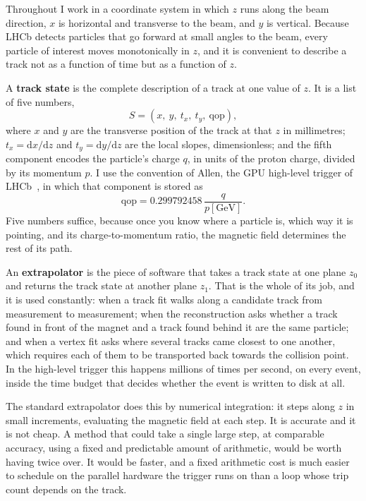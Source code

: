 \documentclass[11pt,a4paper]{article}
\newcommand{\qop}{\ensuremath{\mathrm{qop}}}
\begin{document}
Throughout I work in a coordinate system in which $z$ runs along the beam
direction, $x$ is horizontal and transverse to the beam, and $y$ is vertical.
Because LHCb detects particles that go forward at small angles to the beam,
every particle of interest moves monotonically in $z$, and it is convenient to
describe a track not as a function of time but as a function of $z$.

A \textbf{track state} is the complete description of a track at one value of
$z$. It is a list of five numbers,
%
\begin{equation}
  S = (x,\ y,\ t_x,\ t_y,\ \qop),
  \label{eq:state}
\end{equation}
%
where $x$ and $y$ are the transverse position of the track at that $z$ in
millimetres; $t_x = \mathrm{d}x/\mathrm{d}z$ and $t_y = \mathrm{d}y/\mathrm{d}z$
are the local slopes, dimensionless; and the fifth component encodes the
particle's charge $q$, in units of the proton charge, divided by its momentum
$p$. I use the convention of Allen, the GPU high-level trigger of
LHCb~\cite{aaij2020}, in which that component is stored as
%
\begin{equation}
  \qop = 0.299792458\,\frac{q}{p[\mathrm{GeV}]}.
  \label{eq:qop}
\end{equation}
%
Five numbers suffice, because once you know where a particle is, which way it is
pointing, and its charge-to-momentum ratio, the magnetic field determines the
rest of its path.

An \textbf{extrapolator} is the piece of software that takes a track state at
one plane $z_0$ and returns the track state at another plane $z_1$. That is the
whole of its job, and it is used constantly: when a track fit walks along a
candidate track from measurement to measurement; when the reconstruction asks
whether a track found in front of the magnet and a track found behind it are the
same particle; and when a vertex fit asks where several tracks came closest to
one another, which requires each of them to be transported back towards the
collision point. In the high-level trigger this happens millions of times per
second, on every event, inside the time budget that decides whether the event is
written to disk at all.

The standard extrapolator does this by numerical integration: it steps along $z$
in small increments, evaluating the magnetic field at each step. It is accurate
and it is not cheap. A method that could take a single large step, at comparable
accuracy, using a fixed and predictable amount of arithmetic, would be worth
having twice over. It would be faster, and a fixed arithmetic cost is much
easier to schedule on the parallel hardware the trigger runs on than a loop
whose trip count depends on the track.
\end{document}
